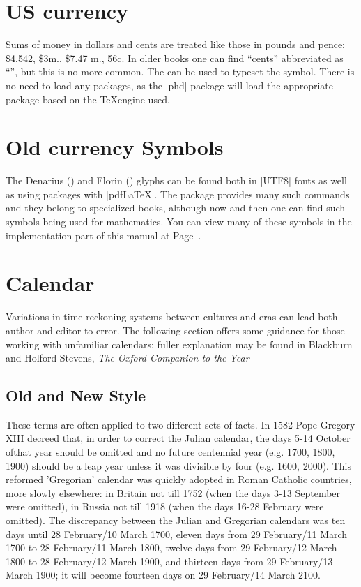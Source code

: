 \section{US currency}

Sums of money in dollars and cents are treated like those in pounds and
pence: \$4,542, \$3m., \$7.47 m., 56c. In older books one can find ``cents'' abbreviated as ``\textcent'', but this is no more common. The \cmd{\textcent} can be used to typeset the \textcent symbol. There is no need to load any packages, as the |phd| package will load the appropriate package based on the \TeX engine used.

\section{Old currency Symbols}
\index{\string \denarius}

The Denarius (\Denarius) and Florin (\Florin) glyphs can be found both in |UTF8| fonts as well as using packages with |pdfLaTeX|. The package  \citep{marvosym} provides many such commands and they belong to specialized books, although now and then one can find such symbols being used for mathematics. You can view many of these symbols in the implementation part of this manual at Page~\pageref{currencysymbols}.

\section{Calendar}

Variations in time-reckoning systems between cultures and eras can
lead both author and editor to error. The following section offers some
guidance for those working with unfamiliar calendars; fuller explanation
may be found in Blackburn and Holford-Stevens, \textit{The Oxford Companion
to the Year}

\subsection{Old and New Style}
These terms are often applied to two different sets of facts. In 1582 Pope
Gregory XIII decreed that, in order to correct the Julian calendar, the
days 5-14 October ofthat year should be omitted and no future centennial
year (e.g. 1700, 1800, 1900) should be a leap year unless it was
divisible by four (e.g. 1600, 2000). This reformed 'Gregorian' calendar
was quickly adopted in Roman Catholic countries, more slowly elsewhere:
in Britain not till 1752 (when the days 3-13 September were
omitted), in Russia not till 1918 (when the days 16-28 February were
omitted). The discrepancy between the Julian and Gregorian calendars
was ten days until 28 February/10 March 1700, eleven days from 29
February/11 March 1700 to 28 February/11 March 1800, twelve days
from 29 February/12 March 1800 to 28 February/12 March 1900, and
thirteen days from 29 February/13 March 1900; it will become fourteen
days on 29 February/14 March 2100.

